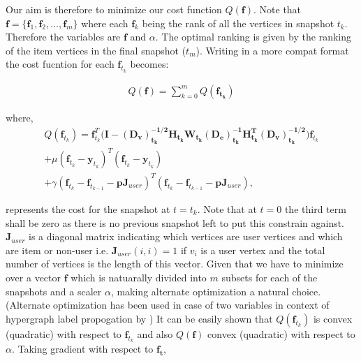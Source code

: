 \documentclass[conference]{IEEEtran}
\begin{document}
Our aim is therefore to minimize our cost function $Q(\mathbf{f})$. Note that $\mathbf{f} = \{ \mathbf{f}_1,\mathbf{f}_2, ..., \mathbf{f}_m\}$ where each $\mathbf{f}_k$ being the rank of all the vertices in snapshot $t_k$. Therefore the variables are $\mathbf{f}$ and $\alpha$. The optimal ranking is given by the ranking of the item vertices in the final snapshot ($t_m$). Writing in a more compat format the cost fucntion for each $\mathbf{f}_{t_k}$ becomes:

\begin{equation}
\begin{align}
Q(\mathbf{f}) = \sum_{k=0}^{m} Q(\mathbf{f_{t_k}})
\end{align}
\end{equation}

where, 
\begin{equation}
\begin{align}
Q(\mathbf{f}_{t_k}) = \mathbf{f}_{t_k}^{T}(\mathbf{I} - \mathbf{(D_v)_{t_k}^{-1/2}}\mathbf{H_{t_k}}\mathbf{W_{t_k}}\mathbf{(D_e)_{t_k}^{-1}}\mathbf{H_{t_k}^{T}}\mathbf{(D_v)_{t_k}^{-1/2})} \mathbf{f}_{t_k} \\ + \mu (\mathbf{f}_{t_k} - \mathbf{y}_{t_k})^{T} (\mathbf{f}_{t_k} - \mathbf{y}_{t_k}) \\ + \gamma (\mathbf{f}_{t_k} - \mathbf{f}_{t_{k-1}} - \mathbf{p} \mathbf{J}_{user})^{T} (\mathbf{f}_{t_k} - \mathbf{f}_{t_{k-1}} - \mathbf{p} \mathbf{J}_{user}), 
\end{align}
\end{equation}

represents the cost for the snapshot at $t=t_k$. Note that at $t=0$ the third term shall be zero as there is no previous snapshot left to put this constrain against.
$\mathbf{J}_{user}$ is a diagonal matrix indicating which vertices are user vertices and which are item or non-user i.e. $\mathbf{J}_{user}(i,i)=1$ if $v_i $ is a user vertex and the total number of vertices is the length of this vector. Given that we have to minimize over a vector $\mathbf{f}$ which is natuarally divided into $m$ subsets for each of the snapshots and a scaler $\alpha$, making alternate optimization \cite{Bezdek02} a natural choice. (Alternate optimization has been used in case of two variables in context of hypergraph label propogation by \cite{kuang09}) It can be easily shown that $Q(\mathbf{f}_{t_k})$ is convex (quadratic) with respect to $\mathbf{f}_{t_k}$ and also $Q(\mathbf{f})$ convex (quadratic) with respect to $\alpha$. Taking gradient with respect to $\mathbf{f_t}$, 
\end{document}
